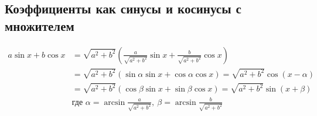 \subsection*{Коэффициенты как синусы и косинусы с множителем}

\begin{align*}
  a \sin x + b \cos x &= \sqrt{a^2+b^2} \left(\frac{a}{\sqrt{a^2+b^2}} \sin x + \frac{b}{\sqrt{a^2+b^2}}\cos x\right) \\ 
  &= \sqrt{a^2+b^2} (\sin \alpha \sin x + \cos \alpha \cos x) = \sqrt{a^2+b^2} \cos(x - \alpha) \\
  &= \sqrt{a^2+b^2} (\cos \beta \sin x + \sin \beta \cos x) = \sqrt{a^2+b^2} \sin(x + \beta) \\
  &\text{где } \alpha=\arcsin \frac{a}{\sqrt{a^2+b^2}},\ \beta = \arcsin \frac{b}{\sqrt{a^2+b^2}}
\end{align*}
